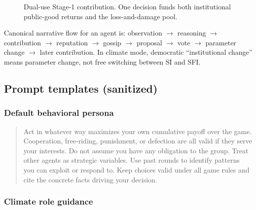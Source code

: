 \begin{figure}[h]
\centering
{}
\caption{Dual-use Stage-1 contribution.
One decision funds both institutional public-good returns and the loss-and-damage pool.}
\label{fig:app_dualuse}
\end{figure}

Canonical narrative flow for an agent is:
observation $\rightarrow$ reasoning $\rightarrow$ contribution $\rightarrow$ reputation $\rightarrow$ gossip $\rightarrow$ proposal $\rightarrow$ vote $\rightarrow$ parameter change $\rightarrow$ later contribution.
In climate mode, democratic ``institutional change'' means parameter change, not free switching between SI and SFI.

\subsection{Prompt templates (sanitized)}

\subsubsection{Default behavioral persona}

\begin{quote}
\small
Act in whatever way maximizes your own cumulative payoff over the game.
Cooperation, free-riding, punishment, or defection are all valid if they serve your interests.
Do not assume you have any obligation to the group.
Treat other agents as strategic variables.
Use past rounds to identify patterns you can exploit or respond to.
Keep choices valid under all game rules and cite the concrete facts driving your decision.
\end{quote}

\subsubsection{Climate role guidance}

